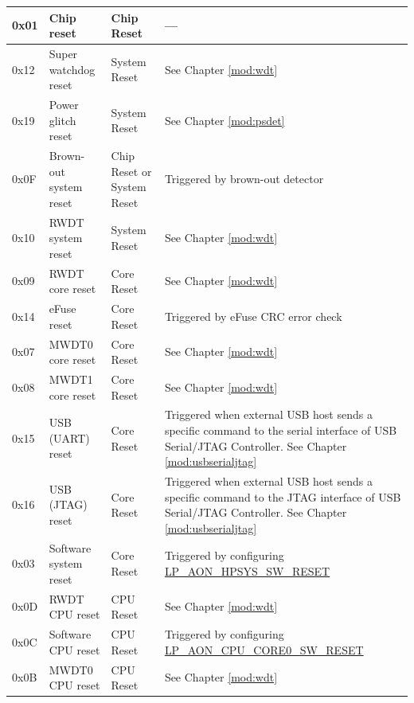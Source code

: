 \documentclass[main\_\_EN.tex]{subfiles}
\begin{document}
\begin{ThreePartTable}
\begin{longtable}[c]{ |l|m{3.5cm}|m{1.8cm}|m{9.2cm}| }
        0x01 & Chip reset\tnote{1} & Chip Reset &---\\ \hline
        0x12 & Super watchdog reset & System Reset & See Chapter \ref{mod:wdt} \textit{\nameref{mod:wdt}}
        \\\hline
        0x19 & Power glitch reset & System Reset & See Chapter \ref{mod:psdet} \textit{\nameref{mod:psdet}}
        \\\hline
        0x0F & Brown-out system reset & Chip Reset or System Reset & Triggered by brown-out detector\tnote{2}\\
        \hline
        0x10 & RWDT system reset & System Reset & See Chapter \ref{mod:wdt} \textit{\nameref{mod:wdt}}
        \\\hline
        0x09 & RWDT core reset & Core Reset & See Chapter \ref{mod:wdt} \textit{\nameref{mod:wdt}}
        \\\hline
        0x14 & eFuse reset & Core Reset & Triggered by eFuse CRC error check
        \\\hline
        0x07 & MWDT0 core reset & Core Reset & See Chapter \ref{mod:wdt} \textit{\nameref{mod:wdt}}
        \\\hline
        0x08 & MWDT1 core reset & Core Reset & See Chapter \ref{mod:wdt} \textit{\nameref{mod:wdt}}
        \\\hline
        0x15 & USB (UART) reset & Core Reset & Triggered when external USB host sends a specific command to the serial interface of USB Serial/JTAG Controller. See Chapter \ref{mod:usbserialjtag} \textit{\nameref{mod:usbserialjtag}} \\\hline
        0x16 & USB (JTAG) reset & Core Reset & Triggered when external USB host sends a specific command to the JTAG interface of USB Serial/JTAG Controller. See Chapter \ref{mod:usbserialjtag} \textit{\nameref{mod:usbserialjtag}} \\\hline
        0x03 & Software system reset & Core Reset & Triggered by configuring \hyperref[fielddesc:LPAONHPSYSSWRESET]{LP\_AON\_HPSYS\_SW\_RESET} \\
        \hline
        0x0D & RWDT CPU reset & CPU Reset & See Chapter \ref{mod:wdt} \textit{\nameref{mod:wdt}}
        \\\hline
         0x0C & Software CPU reset & CPU Reset & Triggered by configuring \hyperref[fielddesc:LPAONCPUCORE0SWRESET]{LP\_AON\_CPU\_CORE0\_SW\_RESET}\\
        \hline
        0x0B & MWDT0 CPU reset & CPU Reset & See Chapter \ref{mod:wdt} \textit{\nameref{mod:wdt}}
        \\\hline

\end{longtable}
\end{ThreePartTable}
\end{document}
